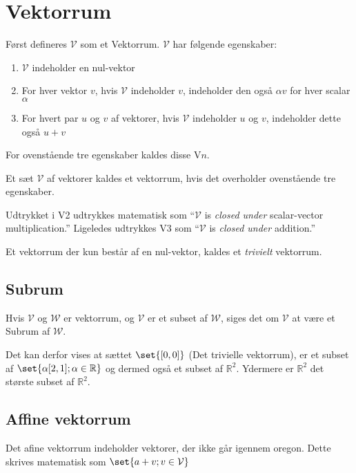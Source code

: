 \section{Vektorrum}
Først defineres $\mathcal{V}$ som et Vektorrum.
$\mathcal{V}$ har følgende egenskaber:
\begin{enumerate}
    \item $\mathcal{V}$ indeholder en nul-vektor
    \item For hver vektor $v$, hvis $\mathcal{V}$ indeholder $v$, indeholder den også $\alpha v$ for hver scalar $\alpha$
    \item For hvert par $u$ og $v$ af vektorer, hvis $\mathcal{V}$ indeholder $u$ og $v$, indeholder dette også $u+v$
\end{enumerate}
For ovenstående tre egenskaber kaldes disse V$n$.
\begin{frdef}
    Et sæt $\mathcal{V}$ af vektorer kaldes et vektorrum, hvis det overholder ovenstående tre egenskaber.
\end{frdef}
Udtrykket i V2 udtrykkes matematisk som ``$\mathcal{V}$ is \textit{closed under} scalar-vector multiplication.''
Ligeledes udtrykkes V3 som ``$\mathcal{V}$ is \textit{closed under} addition.''
\begin{frdef}
    Et vektorrum der kun består af en nul-vektor, kaldes et \textit{trivielt} vektorrum.
\end{frdef}

\subsection{Subrum}
\begin{frdef}
    Hvis $\mathcal{V}$ og $\mathcal{W}$ er vektorrum, og $\mathcal{V}$ er et subset af $\mathcal{W}$, siges det om $\mathcal{V}$ at være et Subrum af $\mathcal{W}$.
\end{frdef}
Det kan derfor vises at sættet $\set{[0,0]}$ (Det trivielle vektorrum), er et subset af $\set{\alpha[2,1];\alpha\in\mathbb{R}}$ og dermed også et subset af $\mathbb{R}^2$.
Ydermere er $\mathbb{R}^2$ det største subset af $\mathbb{R}^2$.

\subsection{Affine vektorrum}
Det afine vektorrum indeholder vektorer, der ikke går igennem oregon.
Dette skrives matematisk som $\set{a+v;v\in\mathcal{V}}$